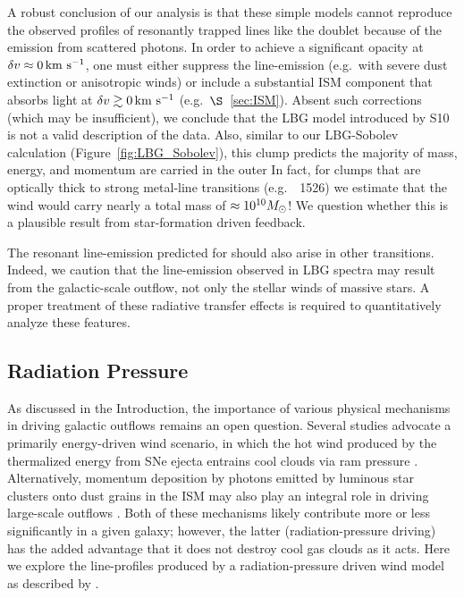 \documentclass[12pt,preprint]{aastex}
\begin{document}
A robust conclusion of our
analysis is that these simple models cannot reproduce the
observed profiles of resonantly trapped lines like the 
doublet because of the emission from scattered photons.  In order to
achieve a significant opacity at $\delta v \approx 0 \, {\rm km~s^{-1}}$, one must
either suppress the line-emission (e.g.\ with severe dust extinction
or anisotropic winds) 
or include a substantial ISM component that absorbs light at $\delta v
\gtrsim 0 \, {\rm km~s^{-1}}$ (e.g.\ $\S$~\ref{sec:ISM}).  
Absent such corrections (which may be insufficient),
we conclude that the LBG model
introduced by S10 is not a valid description of the data.  Also,
similar to our LBG-Sobolev calculation (Figure~\ref{fig:LBG_Sobolev}),
this clump predicts the majority of mass, energy, and momentum are
carried in the outer 
In fact, for clumps that are optically thick to strong metal-line
transitions (e.g.\ ~1526) we estimate that the wind would
carry nearly a total mass of $\approx 10^{10} M_\odot$!  We question
whether this is a plausible result from star-formation driven
feedback.


The resonant line-emission predicted for  should also arise
in other transitions.  Indeed, we caution that the 
line-emission observed in LBG spectra
\citep[e.g.][]{prs+02} may result from the galactic-scale outflow, not
only the stellar winds of massive stars.
A proper treatment of these radiative transfer effects is required to
quantitatively analyze these features.

\subsection{Radiation Pressure}
\label{sec:radiative}

As discussed in the Introduction, the importance of various physical mechanisms
in driving galactic outflows remains an open
question.  Several studies advocate a primarily energy-driven
wind scenario, in which the hot wind produced by the thermalized
energy from SNe ejecta entrains cool clouds via ram pressure \citep[e.g.][]{cc85,ham90,sh09}.
Alternatively, momentum deposition by photons emitted by luminous star clusters onto
dust grains in the ISM may also play an integral role in driving
large-scale outflows \citep[e.g.][]{mqt05,mmt10}.  Both of these
mechanisms likely contribute more or less significantly in a given
galaxy; however, the latter (radiation-pressure driving) has the added
advantage that it does not destroy cool gas clouds as it acts.  Here
we explore the line-profiles produced by a radiation-pressure driven
wind model as described by \cite{mqt05}.
\end{document}
